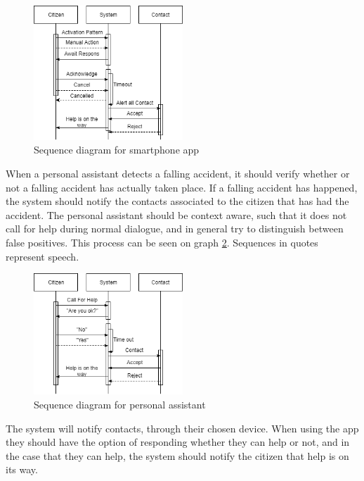 \begin{figure}[H]
    \centering
    \includegraphics[width=0.5\textwidth]{Figures/Phone.png}
    \caption{Sequence diagram for smartphone app}
    \label{fig:SmartPhoneApp}
\end{figure}

When a personal assistant detects a falling accident, it should verify whether or not a falling accident has actually taken place. If a falling accident has happened, the system should notify the contacts associated to the citizen that has had the accident. The personal assistant should be context aware, such that it does not call for help during normal dialogue, and in general try to distinguish between false positives. This process can be seen on graph \ref{fig:PersonAssitent}. Sequences in quotes represent speech.

\begin{figure}[H]
    \centering
    \includegraphics[width=0.5\textwidth]{Figures/PersonAssitent.png}
    \caption{Sequence diagram for personal assistant}
    \label{fig:PersonAssitent}
\end{figure}


The system will notify contacts, through their chosen device. When using the app they should have the option of responding whether they can help or not, and in the case that they can help, the system should notify the citizen that help is on its way.

